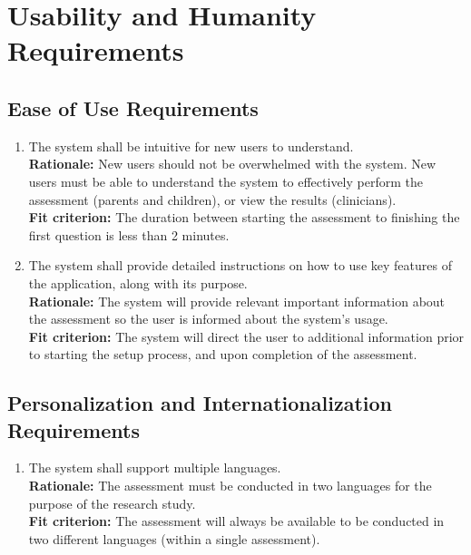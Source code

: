 \documentclass[12pt]{article}
\begin{document}
\section{Usability and Humanity Requirements}
\subsection{Ease of Use Requirements}
\begin{enumerate}[{UH-EOU}1. ]
  \item The system shall be intuitive for new users to understand.\\
  \textbf{Rationale: }New users should not be overwhelmed with the system. New users must be able to understand the system to effectively perform the assessment (parents and children), or view the results (clinicians).\\
  \textbf{Fit criterion: }The duration between starting the assessment to finishing the first question is less than 2 minutes.
  \item The system shall provide detailed instructions on how to use key features of the application, along with its purpose.\\
  \textbf{Rationale: }The system will provide relevant important information about the assessment so the user is informed about the system's usage.\\ 
  \textbf{Fit criterion: }The system will direct the user to additional information prior to starting the setup process, and upon completion of the assessment.
\end{enumerate}
\subsection{Personalization and Internationalization Requirements}
\begin{enumerate}[{UH-PI}1. ]
  \item The system shall support multiple languages.\\
  \textbf{Rationale: }The assessment must be conducted in two languages for the purpose of the research study.\\
  \textbf{Fit criterion: }The assessment will always be available to be conducted in two different languages (within a single assessment).
\end{enumerate}
\end{document}
